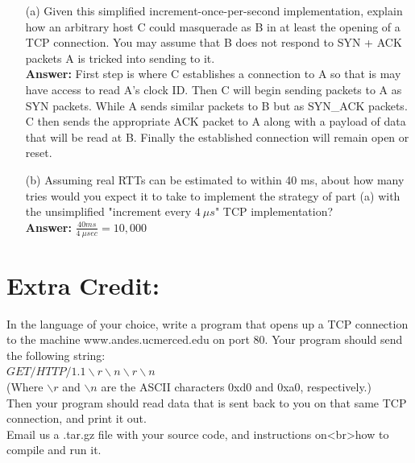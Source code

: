 \documentclass[a4paper]{article}
\begin{document}
\begin{itemize}
	      \begin{itemize}
	      	\item[(a)] Given this simplified increment-once-per-second implementation, explain how an arbitrary host C could masquerade as B in at least the opening of a TCP connection. You may assume that B does not respond to SYN + ACK packets A is tricked into sending to it. \\
	      	      \textbf{Answer:} First step is where C establishes a connection to A so that is may have access to read A's clock ID. Then C will begin sending packets to A as SYN packets. While A sends similar packets to B but as SYN\_ACK packets. C then sends the appropriate ACK packet to A along with a payload of data that will be read at B. Finally the established connection will remain open or reset.
	      	\item[(b)] Assuming real RTTs can be estimated to within 40 ms, about how many tries would you expect it to take to implement the strategy of part (a) with the unsimplified "increment every $\SI{4}{\mu}s$" TCP implementation? \\
	      	      \textbf{Answer:} $\frac{40ms}{\SI{4}{\mu}sec} = 10,000$
	      \end{itemize} 
\end{itemize}

\section*{Extra Credit:}

In the language of your choice, write a program that opens up a TCP connection to the machine www.andes.ucmerced.edu on port 80. Your program should send the following string: \\
$GET / HTTP/1.1\backslash r\backslash n\backslash r\backslash n$ \\
(Where $\backslash r$ and $\backslash n$ are the ASCII characters 0xd0 and 0xa0, respectively.) \\
Then your program should read data that is sent back to you on that same TCP connection, and print it out. \\
Email us a .tar.gz file with your source code, and instructions on<br>how to compile and run it.
\end{document}
